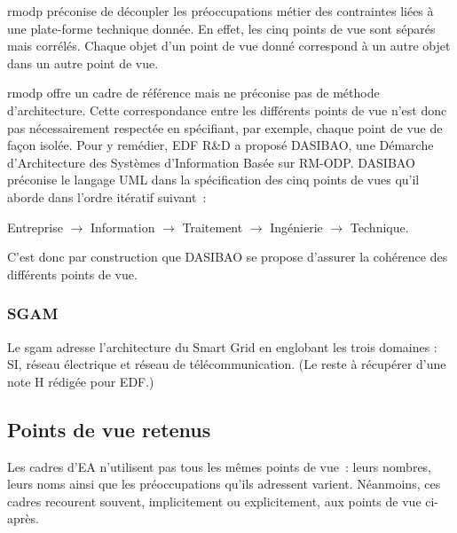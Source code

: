 \gls{rmodp} préconise de découpler les préoccupations métier des
contraintes liées à une plate-forme technique donnée. En effet, les cinq points de vue sont séparés mais corrélés. Chaque objet d'un point de vue donné correspond à un autre objet dans un autre point de vue.

\gls{rmodp} offre un cadre de référence mais ne préconise pas de méthode d'architecture. Cette correspondance entre les différents points de vue n'est donc pas nécessairement respectée en spécifiant, par exemple, chaque point de vue de façon isolée.
Pour y remédier, EDF R\&D a proposé DASIBAO, une Démarche d’Architecture des
Systèmes d’Information Basée sur RM-ODP. DASIBAO préconise le langage UML dans la
spécification des cinq points de vues qu'il aborde dans l'ordre itératif suivant~:

\begin{center}
Entreprise $\rightarrow$ Information $\rightarrow$ Traitement $\rightarrow$ Ingénierie $\rightarrow$ Technique.
\end{center}

C'est donc par construction que DASIBAO se propose d'assurer la cohérence des
différents points de vue.

\subsubsection{SGAM}

Le \gls{sgam} \cite{uslar2012standardization} adresse l'architecture du Smart Grid en englobant les trois domaines : SI, réseau électrique et réseau de télécommunication. (Le reste à récupérer d'une note H rédigée pour EDF.)


\subsection{Points de vue retenus}
Les cadres d'EA n'utilisent pas tous les mêmes points de vue~: leurs nombres,
leurs noms ainsi que les préoccupations qu'ils adressent varient. Néanmoins,
ces cadres recourent souvent, implicitement ou explicitement, aux points de vue
ci-après.

